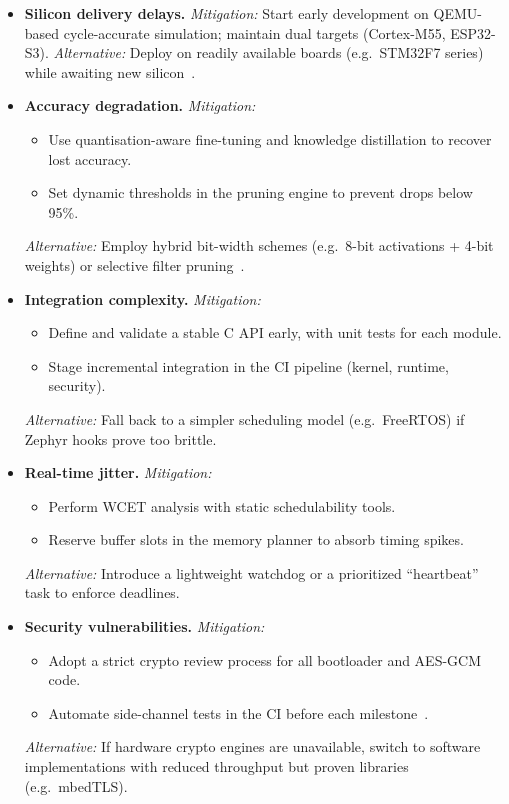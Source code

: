 \begin{itemize}
  \item \textbf{Silicon delivery delays.} 
    \emph{Mitigation:} Start early development on QEMU-based cycle-accurate simulation; maintain dual targets (Cortex-M55, ESP32-S3).  
    \emph{Alternative:} Deploy on readily available boards (e.g.\ STM32F7 series) while awaiting new silicon~\cite{deloitte2021supplychain}.
  
  \item \textbf{Accuracy degradation.} 
    \emph{Mitigation:}  
    \begin{itemize}
      \item Use quantisation-aware fine-tuning and knowledge distillation to recover lost accuracy.
      \item Set dynamic thresholds in the pruning engine to prevent drops below 95\%.
    \end{itemize}
    \emph{Alternative:} Employ hybrid bit-width schemes (e.g.\ 8-bit activations + 4-bit weights) or selective filter pruning~\cite{krishnamoorthi2018quantizing}.
  
  \item \textbf{Integration complexity.} 
    \emph{Mitigation:}  
    \begin{itemize}
      \item Define and validate a stable C API early, with unit tests for each module.
      \item Stage incremental integration in the CI pipeline (kernel, runtime, security).
    \end{itemize}
    \emph{Alternative:} Fall back to a simpler scheduling model (e.g.\ FreeRTOS) if Zephyr hooks prove too brittle.
  
  \item \textbf{Real-time jitter.} 
    \emph{Mitigation:}  
    \begin{itemize}
      \item Perform WCET analysis with static schedulability tools.
      \item Reserve buffer slots in the memory planner to absorb timing spikes.
    \end{itemize}
    \emph{Alternative:} Introduce a lightweight watchdog or a prioritized “heartbeat” task to enforce deadlines.
  
  \item \textbf{Security vulnerabilities.} 
    \emph{Mitigation:}  
    \begin{itemize}
      \item Adopt a strict crypto review process for all bootloader and AES-GCM code.
      \item Automate side-channel tests in the CI before each milestone~\cite{nist2022supplychain}.
    \end{itemize}
    \emph{Alternative:} If hardware crypto engines are unavailable, switch to software implementations with reduced throughput but proven libraries (e.g.\ mbedTLS).
  

\end{itemize}
